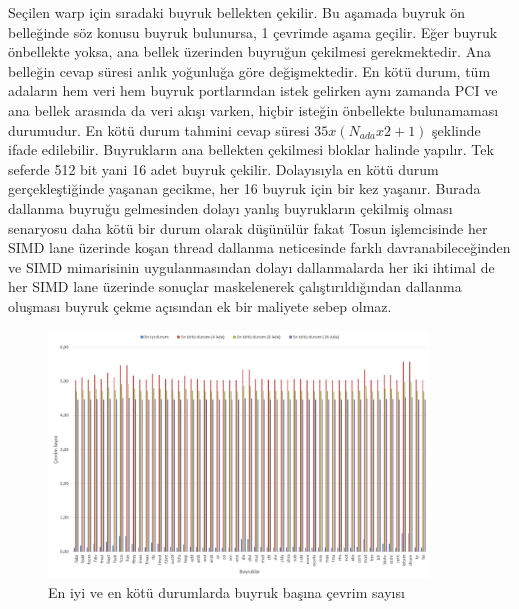 Seçilen warp için sıradaki buyruk bellekten çekilir. Bu aşamada buyruk ön belleğinde söz konusu buyruk bulunursa, 1 çevrimde aşama geçilir. Eğer buyruk önbellekte yoksa, ana bellek üzerinden buyruğun çekilmesi gerekmektedir. Ana belleğin cevap süresi anlık yoğunluğa göre değişmektedir. En kötü durum, tüm adaların hem veri hem buyruk portlarından istek gelirken aynı zamanda PCI ve ana bellek arasında da veri akışı varken, hiçbir isteğin önbellekte bulunamaması durumudur. En kötü durum tahmini cevap süresi $35 x ( N_{ada} x 2 + 1 )$ şeklinde ifade edilebilir. Buyrukların ana bellekten çekilmesi bloklar halinde yapılır. Tek seferde 512 bit yani 16 adet buyruk çekilir. Dolayısıyla en kötü durum gerçekleştiğinde yaşanan gecikme, her 16 buyruk için bir kez yaşanır. Burada dallanma buyruğu gelmesinden dolayı yanlış buyrukların çekilmiş olması senaryosu daha kötü bir durum olarak düşünülür fakat Tosun işlemcisinde her SIMD lane üzerinde koşan thread dallanma neticesinde farklı davranabileceğinden ve SIMD mimarisinin uygulanmasından dolayı dallanmalarda her iki ihtimal de her SIMD lane üzerinde sonuçlar maskelenerek çalıştırıldığından dallanma oluşması buyruk çekme açısından ek bir maliyete sebep olmaz.\par

\begin{figure}[ht] \label{image:fillPipelineBestWorst}
\centering
\shorthandoff{=}
\includegraphics[width=0.9\textwidth]{gorsel/fillPipelineBestWorst.png}
\shorthandoff{=}
\caption{En iyi ve en kötü durumlarda buyruk başına çevrim sayısı}
\end{figure}

